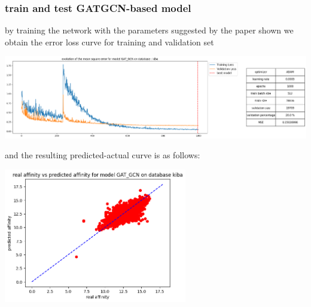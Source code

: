 \documentclass[11pt, a4paper]{article}
\begin{document}
        \subsubsection{train and test GATGCN-based model}
        by training the network with the parameters suggested by the paper shown we obtain the error loss curve for training and validation set 
        \begin{center}
            \includegraphics[width=1.0\textwidth]{train_test_plots/kiba GATGCN train.png}
        \end{center}
        and the resulting predicted-actual curve is as follows:
        \begin{center}
            \includegraphics[width=0.6\textwidth]{train_test_plots/kiba GATGCN test.png}
        \end{center}
\end{document}

